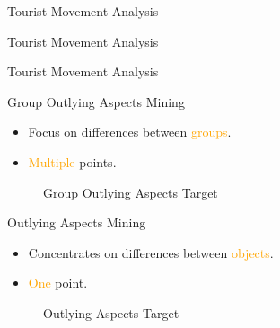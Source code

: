 \documentclass[
 size=14pt,
 paper=smartboard,  %
 mode=present, 		%
 display=slides, 	%
 style=tuliplab,  	%
 pauseslide,
 fleqn,leqno]{powerdot}
\begin{document}
\begin{slide}[toc=,bm=]{Tourist Movement Analysis}


\end{slide}


\begin{slide}[toc=,bm=]{Tourist Movement Analysis}


\end{slide}


\begin{slide}[toc=,bm=]{Tourist Movement Analysis}
\twocolumn
{
Group Outlying Aspects Mining
\begin{itemize}
\item
\smallskip
Focus on differences between \textcolor{orange}{groups}.

\item
\smallskip
\textcolor{orange}{Multiple} points.
\medskip
\end{itemize}
\vspace{0.75cm}
\begin{figure}
  \centering
  \caption{Group Outlying Aspects Target}\label{fig:GroupOutAspect-target}
\end{figure}
}
{
Outlying Aspects Mining
\begin{itemize}
\item
Concentrates on differences between \textcolor{orange}{objects}.

\item
\textcolor{orange}{One} point.
\end{itemize}
\bigskip
\begin{figure}
  \centering
  \caption{Outlying Aspects Target}\label{fig:OutAspect-target}
\end{figure}
}

\end{slide}
\end{document}
